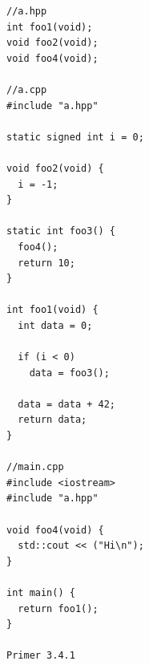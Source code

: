\documentclass[12pt,oneside]{memoir}
\begin{document}
\begin{lstlisting}
//a.hpp
int foo1(void);
void foo2(void);
void foo4(void);

//a.cpp
#include "a.hpp"

static signed int i = 0;

void foo2(void) {
  i = -1;
}

static int foo3() {
  foo4();
  return 10;
}

int foo1(void) {
  int data = 0;

  if (i < 0)
    data = foo3();

  data = data + 42;
  return data;
}

//main.cpp
#include <iostream>
#include "a.hpp"

void foo4(void) {
  std::cout << ("Hi\n");
}

int main() {
  return foo1();
}

Primer 3.4.1
\end{lstlisting}
\end{document}
